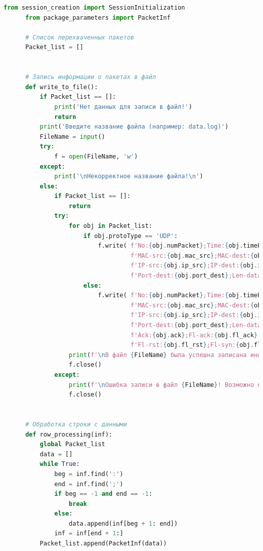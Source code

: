 \documentclass[bachelor, och, coursework]{SCWorks}
\begin{document}
    \begin{lstlisting}[language=Python]
      from session_creation import SessionInitialization
      from package_parameters import PacketInf
      
      # Список перехваченных пакетов
      Packet_list = []
      
      
      # Запись информации о пакетах в файл
      def write_to_file():
          if Packet_list == []:
              print('Нет данных для записи в файл!')
              return
          print('Введите название файла (например: data.log)')
          FileName = input()
          try:
              f = open(FileName, 'w')
          except:
              print('\nНекорректное название файла!\n')
          else:
              if Packet_list == []:
                  return
              try:
                  for obj in Packet_list:
                      if obj.protoType == 'UDP':
                          f.write( f'No:{obj.numPacket};Time:{obj.timePacket};Pac-size:{obj.packetSize};' +
                                   f'MAC-src:{obj.mac_src};MAC-dest:{obj.mac_dest};Type:{obj.protoType};' + 
                                   f'IP-src:{obj.ip_src};IP-dest:{obj.ip_dest};Port-src:{obj.port_src};' + 
                                   f'Port-dest:{obj.port_dest};Len-data:{obj.len_data};!\n' )
                      else:
                          f.write( f'No:{obj.numPacket};Time:{obj.timePacket};Pac-size:{obj.packetSize};' +
                                   f'MAC-src:{obj.mac_src};MAC-dest:{obj.mac_dest};Type:{obj.protoType};' + 
                                   f'IP-src:{obj.ip_src};IP-dest:{obj.ip_dest};Port-src:{obj.port_src};' + 
                                   f'Port-dest:{obj.port_dest};Len-data:{obj.len_data};Seq:{obj.seq};' +
                                   f'Ack:{obj.ack};Fl-ack:{obj.fl_ack};Fl-psh:{obj.fl_psh};' +
                                   f'Fl-rst:{obj.fl_rst};Fl-syn:{obj.fl_syn};Fl-fin:{obj.fl_fin};Win-size:{obj.win_size};!\n' )
                  print(f'\nВ файл {FileName} была успешна записана информация.\n')
                  f.close()
              except:
                  print(f'\nОшибка записи в файл {FileName}! Возможно нет данных для записи\n')
                  f.close()
      
      
      # Обработка строки с данными
      def row_processing(inf):
          global Packet_list
          data = []
          while True:
              beg = inf.find(':')
              end = inf.find(';')
              if beg == -1 and end == -1:
                  break
              else:
                  data.append(inf[beg + 1: end])
              inf = inf[end + 1:]
          Packet_list.append(PacketInf(data))
      

\end{lstlisting}
\end{document}
